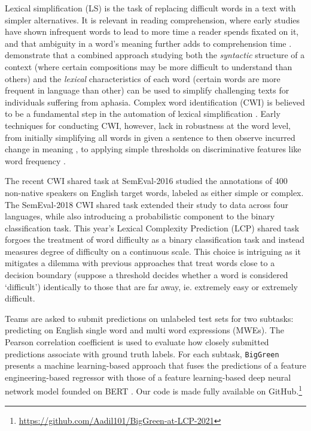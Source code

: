 \documentclass{dcthesis}
\theoremstyle{definition}
\theoremstyle{remark}
\begin{document}
Lexical simplification (LS) is the task of replacing difficult words in a text with simpler alternatives. It is relevant in reading comprehension, where early studies have shown infrequent words to lead to more time a reader spends fixated on it, and that ambiguity in a word's meaning further adds to comprehension time \citep{rayner1986lexical}. \citet{devlin1999simplifying} demonstrate that a combined approach studying both the \textit{syntactic} structure of a context (where certain compositions may be more difficult to understand than others) and the \textit{lexical} characteristics of each word (certain words are more frequent in language than other) can be used to simplify challenging texts for individuals suffering from aphasia. Complex word identification (CWI) is believed to be a fundamental step in the automation of lexical simplification \citep{shardlow2014out}. Early techniques for conducting CWI, however, lack in robustness at the word level, from initially simplifying all words in given a sentence to then observe incurred change in meaning \citep{devlin1998use}, to applying simple thresholds on discriminative features like word frequency \citep{zeng2005text}.

The recent CWI shared task at SemEval-2016 \citep{paetzold2016semeval} studied the annotations of 400 non-native speakers on English target words, labeled as either simple or complex. The SemEval-2018 CWI shared task \citep{yimam2018report} extended their study to data across four languages, while also introducing a probabilistic component to the binary classification task. This year's Lexical Complexity Prediction (LCP) shared task \citep{shardlow2021semeval} forgoes the treatment of word difficulty as a binary classification task \citep{paetzold2016semeval, yimam2018report} and instead measures degree of difficulty on a continuous scale. This choice is intriguing as it mitigates a dilemma with previous approaches that treat words close to a decision boundary (suppose a threshold decides whether a word is considered `difficult') identically to those that are far away, ie. extremely easy or extremely difficult.

Teams are asked to submit predictions on unlabeled test sets for two subtasks: predicting on English single word and multi word expressions (MWEs). The Pearson correlation coefficient is used to evaluate how closely submitted predictions associate with ground truth labels. For each subtask, \texttt{BigGreen} presents a machine learning-based approach that fuses the predictions of a feature engineering-based regressor with those of a feature learning-based deep neural network model founded on BERT \citep{devlin2018bert}. Our code is made fully available on GitHub.\footnote{\url{https://github.com/Aadil101/BigGreen-at-LCP-2021}}
\end{document}
